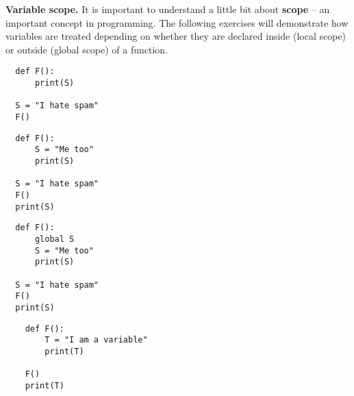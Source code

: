 \documentclass[11pt]{report}
\begin{document}
\begin{Exercise}[title=Variable scope (Essential)]

\textbf{Variable scope.} It is important to understand a little bit about \textbf{scope} -- an important concept in programming. The following exercises will demonstrate how variables are treated depending on whether they are declared inside (local scope) or outside (global scope) of a function.

\begin{verbatim}
  def F():
      print(S)
    
  S = "I hate spam"
  F()
\end{verbatim}

\begin{verbatim}
  def F():
      S = "Me too"
      print(S)
  
  S = "I hate spam"
  F()
  print(S)
\end{verbatim}

\begin{verbatim}
  def F():
      global S
      S = "Me too"
      print(S)

  S = "I hate spam"
  F()
  print(S)
\end{verbatim}



  \begin{verbatim}
    def F():
        T = "I am a variable"
        print(T)
    
    F()
    print(T)
\end{verbatim}

		
\end{Exercise}
\end{document}
